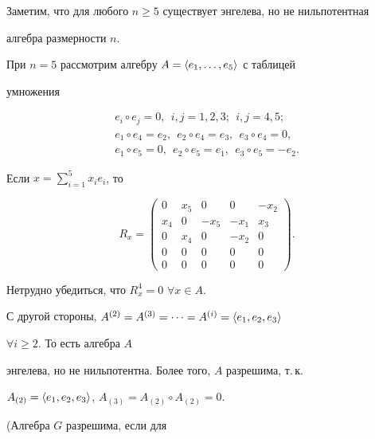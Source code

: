  


Заметим, что для любого $n\ge5$ существует энгелева, но не нильпотентная 


алгебра размерности $n$. 


 


При $n=5$ рассмотрим алгебру $A=\langle e_1,\dotsc,e_5\rangle$ с таблицей 


умножения 


\begin{gather*} 


e_i\circ e_j=0,\ \ i,j=1,2,3; \ \ i,j=4,5;\\ 


e_1\circ e_4=e_2, \ \ e_2\circ e_4=e_3,\ \ e_3\circ e_4=0,\\ 


e_1\circ e_5=0,\ \ e_2\circ e_5=e_1,\ \ e_3\circ e_5=-e_2. 


\end{gather*} 


Если $x=\sum\limits^5_{i=1}x_i e_i$, то 


$$ 


R_x= 


\begin{pmatrix} 


0 & x_5 & 0 & 0 & -x_2 \\ 


x_4 & 0 & -x_5 & -x_1 & x_3 \\ 


0 & x_4 & 0 & -x_2 & 0 \\ 


0 & 0 & 0 & 0 & 0 \\ 


0 & 0 & 0 & 0 & 0 


\end{pmatrix} 


. 


$$ 


Нетрудно убедиться, что $R^4_x=0$ $\forall x\in A$. 


 


С другой стороны, $A^{(2)}=A^{(3)}=\dotsb=A^{(i)}=\langle e_1,e_2,e_3\rangle$ 


$\forall i\ge 2$. То есть алгебра $A$ 


энгелева, но не нильпотентна. Более того, $A$ разрешима, т.\,к. 


$A_{(2)}=\langle e_1,e_2,e_3\rangle$, $A_{(3)}=A_{(2)}\circ A_{(2)}=0$. 


(Алгебра $G$ разрешима, если для 


